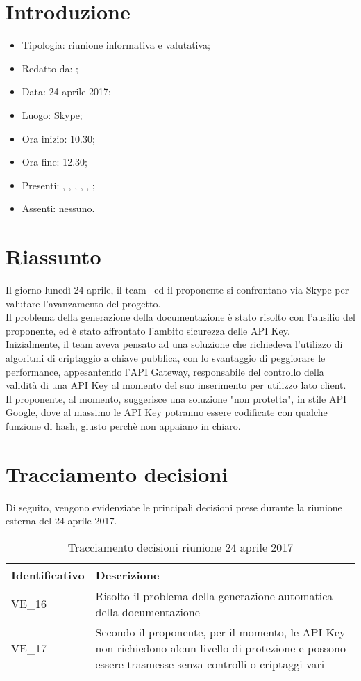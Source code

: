 \section{Introduzione}

	\begin{itemize}
		\item Tipologia: riunione informativa e valutativa;
		\item Redatto da: \AS;
		\item Data: 24 aprile 2017;
		\item Luogo: Skype;
		\item Ora inizio: 10.30;
		\item Ora fine: 12.30;
		\item Presenti: \DS, \NS, \MC, \DAN, \AS, \AN;	
		\item Assenti: nessuno.
	\end{itemize}

\section{Riassunto}
Il giorno lunedì 24 aprile, il team \gruppo\ ed il proponente si confrontano via Skype per valutare l'avanzamento del progetto.\\
Il problema della generazione della documentazione è stato risolto con l'ausilio del proponente, ed è stato affrontato l'ambito sicurezza delle API Key.\\
Inizialmente, il team aveva pensato ad una soluzione che richiedeva l'utilizzo di algoritmi di criptaggio a chiave pubblica, con lo svantaggio di peggiorare le performance,  appesantendo l'API Gateway, responsabile del controllo della validità di una API Key al momento del suo inserimento per utilizzo lato client.\\
Il proponente, al momento, suggerisce una soluzione "non protetta", in stile API Google, dove al massimo le API Key potranno essere codificate con qualche funzione di hash, giusto perchè non appaiano in chiaro.

\section{Tracciamento decisioni}
Di seguito, vengono evidenziate le principali decisioni prese durante la riunione esterna del 24 aprile 2017.

\begin{table}[H]
	\begin{center}
		\begin{tabular}{|p{3cm}| p{11cm}|}
			\hline
			\textbf{Identificativo}	& \textbf{Descrizione} \\
			\hline
			VE\_16	&  Risolto il problema della generazione automatica della documentazione \\
			\hline
			VE\_17 & Secondo il proponente, per il momento, le API Key non richiedono alcun livello di protezione e possono essere trasmesse senza controlli o criptaggi vari \\
			\hline
		\end{tabular}
		\caption{Tracciamento decisioni riunione 24 aprile 2017}
	\end{center}
\end{table}